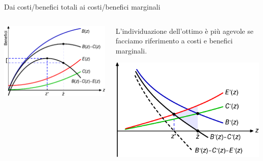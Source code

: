 \documentclass[aspectratio=64,12pt]{beamer}
\begin{document}
\begin{frame}{Dai costi/benefici totali ai costi/benefici marginali}
\begin{columns}
\begin{column}[b]{.5\columnwidth}
\begin{center}
\includegraphics[width=\textwidth]{./figure/esternalita-1-color.pdf}
\end{center}

\vfill

\hfill
{}
\end{column}

\begin{column}[b]{.5\columnwidth}
L'individuazione dell'ottimo è più agevole se facciamo riferimento a costi e
benefici marginali.
\vfill

\begin{center}
\includegraphics[width=\textwidth]{./figure/esternalita-2-color.pdf}
\end{center}
\end{column}
\end{columns}
\end{frame}
\end{document}
